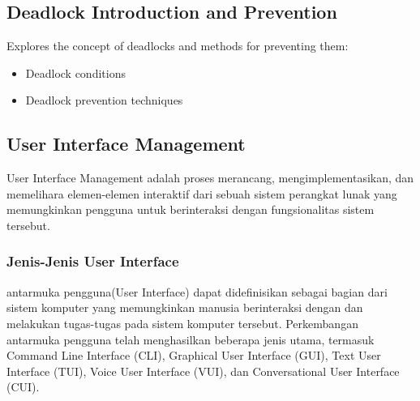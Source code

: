 \documentclass[12pt]{article}
\begin{document}
\subsection{Deadlock Introduction and Prevention}
Explores the concept of deadlocks and methods for preventing them:
\begin{itemize}
    \item Deadlock conditions
    \item Deadlock prevention techniques
\end{itemize}

\subsection{User Interface Management}


User Interface Management adalah proses merancang, mengimplementasikan, dan memelihara elemen-elemen interaktif dari sebuah sistem perangkat lunak yang memungkinkan pengguna untuk berinteraksi dengan fungsionalitas sistem  tersebut.

\subsubsection{Jenis-Jenis User Interface}
\par antarmuka pengguna(User Interface) dapat didefinisikan sebagai bagian dari sistem komputer yang memungkinkan manusia berinteraksi dengan dan melakukan tugas-tugas pada sistem komputer tersebut. Perkembangan antarmuka pengguna telah menghasilkan beberapa jenis utama, termasuk Command Line Interface (CLI), Graphical User Interface (GUI), Text User Interface (TUI), Voice User Interface (VUI), dan Conversational User Interface (CUI). 
\end{document}
